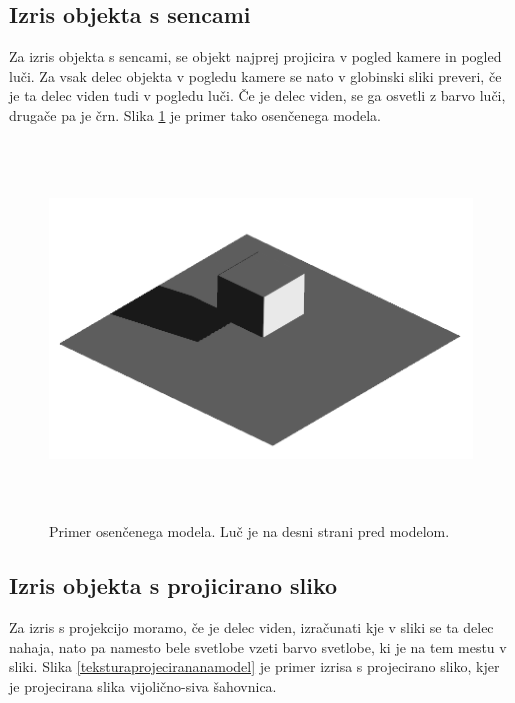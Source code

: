 \documentclass[a4paper, 12pt]{book}
\begin{document}
\subsection*{Izris objekta s sencami}
Za izris objekta s sencami, se objekt najprej projicira v pogled kamere in pogled luči. Za vsak delec objekta v pogledu kamere se nato v globinski sliki preveri, če je ta delec viden tudi v pogledu luči. Če je delec viden, se ga osvetli z barvo luči, drugače pa je črn. Slika \ref{osencenmodel} je primer tako osenčenega modela.

\begin{figure}[h]
\begin{center}
\includegraphics[width=12cm, height=10cm, keepaspectratio=true]{Osencen_model.png}
\end{center}
\caption{Primer osenčenega modela. Luč je na desni strani pred modelom.}
\label{osencenmodel}
\end{figure}

\subsection*{Izris objekta s projicirano sliko}
Za izris s projekcijo moramo, če je delec viden, izračunati kje v sliki se ta delec nahaja, nato pa namesto bele svetlobe vzeti barvo svetlobe, ki je na tem mestu v sliki. Slika \ref{teksturaprojecirananamodel} je primer izrisa s projecirano sliko, kjer je projecirana slika vijolično-siva šahovnica.
\end{document}
